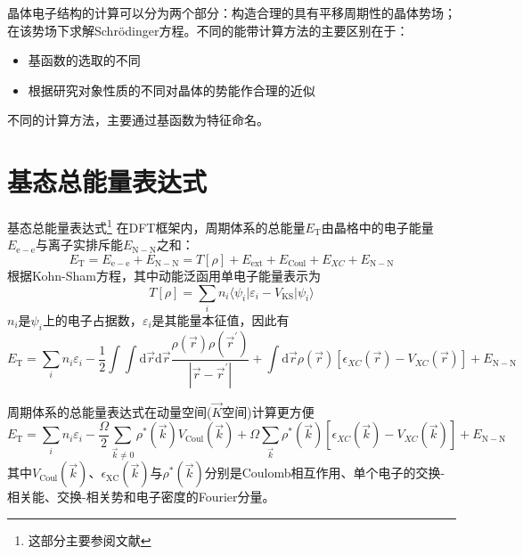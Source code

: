 晶体电子结构的计算可以分为两个部分：构造合理的具有平移周期性的晶体势场；在该势场下求解Schr\"odinger方程。不同的能带计算方法的主要区别在于：
\begin{itemize}
	\item 基函数的选取的不同
	\item 根据研究对象性质的不同对晶体的势能作合理的近似
\end{itemize}
不同的计算方法，主要通过基函数为特征命名。

\section{基态总能量表达式}
基态总能量表达式\footnote{这部分主要参阅文献}
在DFT框架内，周期体系的总能量$E_{\mathrm{T}}$由晶格中的电子能量$E_{\mathrm{e-e}}$与离子实排斥能$E_{\mathrm{N-N}}$之和：
	\begin{equation}
		E_{\mathrm{T}}=E_{\mathrm{e-e}}+E_{\mathrm{N-N}}=T[\rho]+E_{\mathrm{ext}}+E_{\mathrm{Coul}}+E_{XC}+E_{\mathrm{N-N}}
	\end{equation}
根据\textrm{Kohn-Sham}方程，其中动能泛函用单电子能量表示为
\begin{equation}
	T[{\rho}]=\sum_in_i\langle\psi_i|\varepsilon_i-V_{\mathrm{KS}}|\psi_i\rangle
\end{equation}
$n_i$是$\psi_i$上的电子占据数，$\varepsilon_i$是其能量本征值，因此有
\begin{equation}
	E_{\mathrm{T}}=\sum_in_i\varepsilon_i-\dfrac12\int\int\mathrm{d}\vec r\mathrm{d}\vec r\dfrac{\rho(\vec r)\rho(\vec r^{\prime})}{|\vec r-\vec r^{\prime}|}+\int\mathrm{d}\vec r\rho(\vec r)[\epsilon_{XC}(\vec r)-V_{XC}(\vec r)]+E_{\mathrm{N-N}}
	\label{eq:PP_TOT_R}
\end{equation}

周期体系的总能量表达式在动量空间($\vec K$空间)计算更方便
\begin{equation}
	E_{\mathrm{T}}=\sum_in_i\varepsilon_i-\dfrac{\Omega}2\sum_{\vec k\neq 0}\rho^{\ast}(\vec k)V_{\mathrm{Coul}}(\vec k)+\Omega\sum_{\vec k}\rho^{\ast}(\vec k)[\epsilon_{XC}(\vec k)-V_{XC}(\vec k)]+E_{\mathrm{N-N}}
\end{equation}
其中$V_{\mathrm{Coul}}(\vec k)$、$\epsilon_{\mathrm{XC}}(\vec k)$与$\rho^{\ast}(\vec k)$分别是\textrm{Coulomb}相互作用、单个电子的交换-相关能、交换-相关势和电子密度的\textrm{Fourier}分量。

